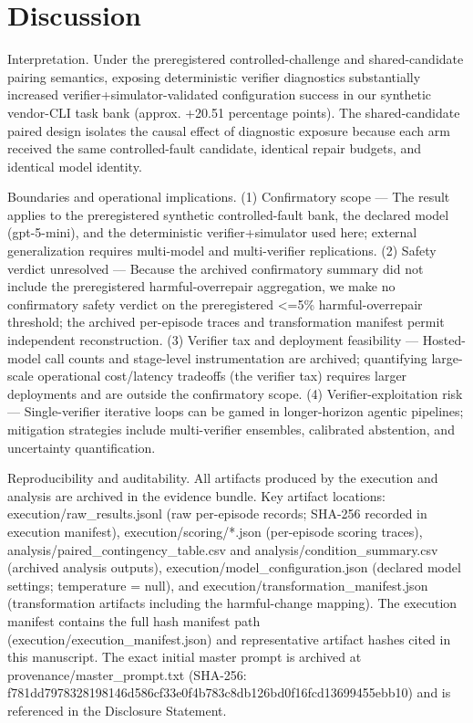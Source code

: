\documentclass[conference]{IEEEtran}
\begin{document}
\section{Discussion}
Interpretation. Under the preregistered controlled-challenge and shared-candidate pairing semantics, exposing deterministic verifier diagnostics substantially increased verifier+simulator-validated configuration success in our synthetic vendor-CLI task bank (approx. +20.51 percentage points). The shared-candidate paired design isolates the causal effect of diagnostic exposure because each arm received the same controlled-fault candidate, identical repair budgets, and identical model identity.

Boundaries and operational implications. (1) Confirmatory scope --- The result applies to the preregistered synthetic controlled-fault bank, the declared model (gpt-5-mini), and the deterministic verifier+simulator used here; external generalization requires multi-model and multi-verifier replications. (2) Safety verdict unresolved --- Because the archived confirmatory summary did not include the preregistered harmful-overrepair aggregation, we make no confirmatory safety verdict on the preregistered <=5\% harmful-overrepair threshold; the archived per-episode traces and transformation manifest permit independent reconstruction. (3) Verifier tax and deployment feasibility --- Hosted-model call counts and stage-level instrumentation are archived; quantifying large-scale operational cost/latency tradeoffs (the verifier tax) requires larger deployments and are outside the confirmatory scope. (4) Verifier-exploitation risk --- Single-verifier iterative loops can be gamed in longer-horizon agentic pipelines; mitigation strategies include multi-verifier ensembles, calibrated abstention, and uncertainty quantification.

Reproducibility and auditability. All artifacts produced by the execution and analysis are archived in the evidence bundle. Key artifact locations: execution/raw\_results.jsonl (raw per-episode records; SHA-256 recorded in execution manifest), execution/scoring/*.json (per-episode scoring traces), analysis/paired\_contingency\_table.csv and analysis/condition\_summary.csv (archived analysis outputs), execution/model\_configuration.json (declared model settings; temperature = null), and execution/transformation\_manifest.json (transformation artifacts including the harmful-change mapping). The execution manifest contains the full hash manifest path (execution/execution\_manifest.json) and representative artifact hashes cited in this manuscript. The exact initial master prompt is archived at provenance/master\_prompt.txt (SHA-256: f781dd79\allowbreak{}78328198\allowbreak{}146d586c\allowbreak{}f33e0f4b\allowbreak{}783c8db1\allowbreak{}26bd0f16\allowbreak{}fcd13699\allowbreak{}455ebb10) and is referenced in the Disclosure Statement.
\end{document}
